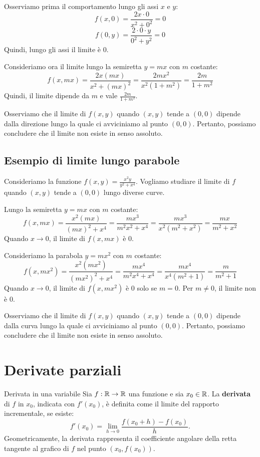 Osserviamo prima il comportamento lungo gli assi $x$ e $y$:
\[
f(x,0) = \frac{2x \cdot 0}{x^2 + 0^2} = 0
\]
\[
f(0,y) = \frac{2 \cdot 0 \cdot y}{0^2 + y^2} = 0
\]
Quindi, lungo gli assi il limite è $0$.

Consideriamo ora il limite lungo la semiretta $y=mx$ con $m$ costante:
\[
f(x,mx) = \frac{2x(mx)}{x^2+(mx)^2} = \frac{2mx^2}{x^2(1+m^2)} = \frac{2m}{1+m^2}
\]
Quindi, il limite dipende da $m$ e vale $\frac{2m}{1+m^2}$.

Osserviamo che il limite di $f(x,y)$ quando $(x,y)$ tende a $(0,0)$ dipende dalla direzione lungo la quale ci avviciniamo al punto $(0,0)$. Pertanto, possiamo concludere che il limite non esiste in senso assoluto.

\subsection{Esempio di limite lungo parabole}
Consideriamo la funzione $f(x,y)= \frac{x^2y}{y^2+x^4}$. Vogliamo studiare il limite di $f$ quando $(x,y)$ tende a $(0,0)$ lungo diverse curve.

Lungo la semiretta $y=mx$ con $m$ costante:
\[
f(x,mx) = \frac{x^2(mx)}{(mx)^2+x^4} = \frac{mx^3}{m^2x^2+x^4} = \frac{mx^3}{x^2(m^2+x^2)} = \frac{mx}{m^2+x^2}
\]
Quando $x \to 0$, il limite di $f(x,mx)$ è $0$.

Consideriamo la parabola $y=mx^2$ con $m$ costante:
\[
f(x,mx^2) = \frac{x^2(mx^2)}{(mx^2)^2+x^4} = \frac{mx^4}{m^2x^4+x^4} = \frac{mx^4}{x^4(m^2+1)} = \frac{m}{m^2+1}
\]
Quando $x \to 0$, il limite di $f(x,mx^2)$ è $0$ solo se $m=0$. Per $m \neq 0$, il limite non è $0$.

Osserviamo che il limite di $f(x,y)$ quando $(x,y)$ tende a $(0,0)$ dipende dalla curva lungo la quale ci avviciniamo al punto $(0,0)$. Pertanto, possiamo concludere che il limite non esiste in senso assoluto.

\section{Derivate parziali}
\begin{definizione}{Derivata in una variabile}
Sia $f: \mathbb{R} \rightarrow \mathbb{R}$ una funzione e sia $x_0 \in \mathbb{R}$. La \textbf{derivata} di $f$ in $x_0$, indicata con $f'(x_0)$, è definita come il limite del rapporto incrementale, se esiste:
$$f'(x_0) = \lim_{h \to 0} \frac{f(x_0 + h) - f(x_0)}{h}.$$
Geometricamente, la derivata rappresenta il coefficiente angolare della retta tangente al grafico di $f$ nel punto $(x_0, f(x_0))$.
\end{definizione}

